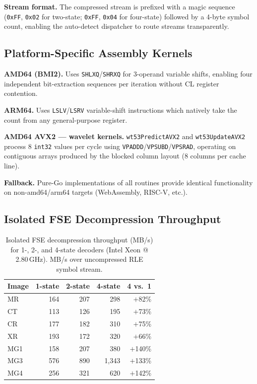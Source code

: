 \documentclass[journal]{IEEEtran}
\begin{document}
\textbf{Stream format.} The compressed stream is prefixed with a magic sequence
(\texttt{0xFF}, \texttt{0x02} for two-state; \texttt{0xFF}, \texttt{0x04} for
four-state) followed by a 4-byte symbol count, enabling the auto-detect
dispatcher to route streams transparently.

\subsection{Platform-Specific Assembly Kernels}

\textbf{AMD64 (BMI2).} Uses \texttt{SHLXQ}/\texttt{SHRXQ} for 3-operand
variable shifts, enabling four independent bit-extraction sequences per
iteration without CL register contention.

\textbf{ARM64.} Uses \texttt{LSLV}/\texttt{LSRV} variable-shift instructions
which natively take the count from any general-purpose register.

\textbf{AMD64 AVX2 --- wavelet kernels.} \texttt{wt53PredictAVX2} and
\texttt{wt53UpdateAVX2} process 8 \texttt{int32} values per cycle using
\texttt{VPADDD}/\texttt{VPSUBD}/\texttt{VPSRAD}, operating on contiguous arrays
produced by the blocked column layout (8 columns per cache line).

\textbf{Fallback.} Pure-Go implementations of all routines provide identical
functionality on non-amd64/arm64 targets (WebAssembly, RISC-V, etc.).

\subsection{Isolated FSE Decompression Throughput}

\begin{table}[htbp]
\centering
\caption{Isolated FSE decompression throughput (MB/s) for 1-, 2-, and 4-state
decoders (Intel Xeon @ 2.80\,GHz). MB/s over uncompressed RLE symbol stream.}
\label{tab:fse-throughput}
\begin{tabular}{lrrrr}
\toprule
Image & 1-state & 2-state & 4-state & 4 vs.\ 1 \\
\midrule
MR  & 164 & 207 & 298  & $+$82\%  \\
CT  & 113 & 126 & 195  & $+$73\%  \\
CR  & 177 & 182 & 310  & $+$75\%  \\
XR  & 193 & 172 & 320  & $+$66\%  \\
MG1 & 158 & 207 & 380  & $+$140\% \\
MG3 & 576 & 890 & 1,343 & $+$133\% \\
MG4 & 256 & 321 & 620  & $+$142\% \\
\bottomrule
\end{tabular}
\end{table}
\end{document}
